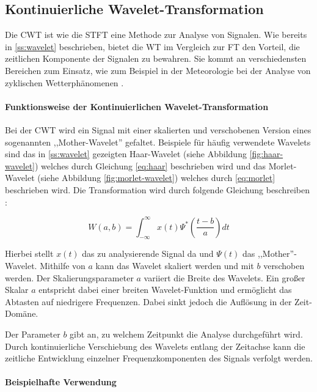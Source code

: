 \subsection{Kontinuierliche Wavelet-Transformation}

Die \ac{CWT} ist wie die \ac{STFT} eine Methode zur Analyse von Signalen. Wie bereits in \ref{ss:wavelet} beschrieben, bietet die \ac{WT} im Vergleich zur \ac{FT} den Vorteil, die zeitlichen Komponente der Signalen zu bewahren. 
Sie kommt an verschiedensten Bereichen zum Einsatz, wie zum Beispiel in der Meteorologie bei der Analyse von zyklischen Wetterphänomenen \cite{Torrence1999}.

\paragraph{Funktionsweise der Kontinuierlichen Wavelet-Transformation}

Bei der \ac{CWT} wird ein Signal mit einer skalierten und verschobenen Version eines sogenannten ,,Mother-Wavelet'' gefaltet. Beispiele für häufig verwendete Wavelets sind das in \ref{ss:wavelet} gezeigten Haar-Wavelet (siehe Abbildung \ref{fig:haar-wavelet}) welches durch Gleichung \ref{eq:haar} beschrieben wird und das Morlet-Wavelet (siehe Abbildung \ref{fig:morlet-wavelet}) welches durch \ref{eq:morlet} beschrieben wird. Die Transformation wird durch folgende Gleichung beschreiben \cite[92]{Schulte2019}:

\begin{equation}
W(a, b) = \int_{-\infty}^\infty x(t) \Psi^* \left( \frac{t - b}{a} \right) dt
\end{equation}

Hierbei stellt \(x(t)\) das zu analysierende Signal da und \(\Psi(t)\) das ,,Mother''-Wavelet. Mithilfe von \(a\) kann das Wavelet skaliert werden und mit \(b\) verschoben werden. 
Der Skalierungsparameter \(a\) variiert die Breite des Wavelets. Ein großer Skalar \(a\) entspricht dabei einer breiten Wavelet-Funktion und ermöglicht das Abtasten auf niedrigere Frequenzen. Dabei sinkt jedoch die Auflösung in der Zeit-Domäne. \cite{Torrence1998}

Der Parameter \(b\) gibt an, zu welchem Zeitpunkt die Analyse durchgeführt wird. Durch kontinuierliche Verschiebung des Wavelets entlang der Zeitachse kann die zeitliche Entwicklung einzelner Frequenzkomponenten des Signals verfolgt werden.

\paragraph{Beispielhafte Verwendung}

